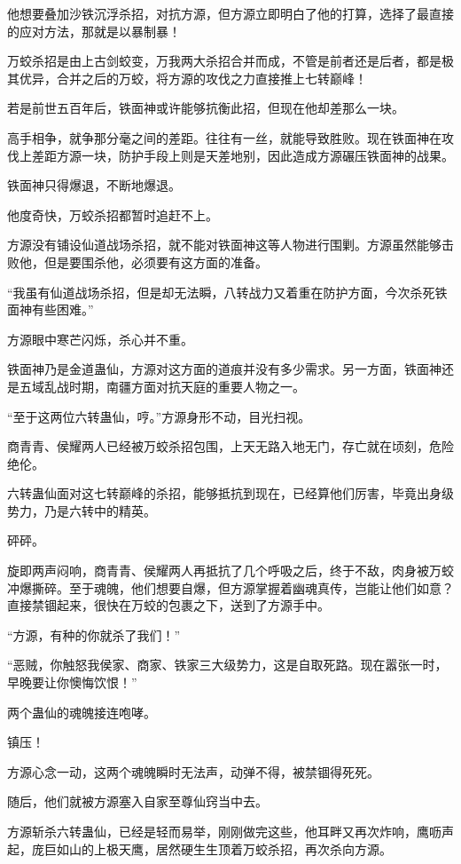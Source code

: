 \begin{this_body}
他想要叠加沙铁沉浮杀招，对抗方源，但方源立即明白了他的打算，选择了最直接的应对方法，那就是以暴制暴！

万蛟杀招是由上古剑蛟变，万我两大杀招合并而成，不管是前者还是后者，都是极其优异，合并之后的万蛟，将方源的攻伐之力直接推上七转巅峰！

若是前世五百年后，铁面神或许能够抗衡此招，但现在他却差那么一块。

高手相争，就争那分毫之间的差距。往往有一丝，就能导致胜败。现在铁面神在攻伐上差距方源一块，防护手段上则是天差地别，因此造成方源碾压铁面神的战果。

铁面神只得爆退，不断地爆退。

他度奇快，万蛟杀招都暂时追赶不上。

方源没有铺设仙道战场杀招，就不能对铁面神这等人物进行围剿。方源虽然能够击败他，但是要围杀他，必须要有这方面的准备。

“我虽有仙道战场杀招，但是却无法瞬，八转战力又着重在防护方面，今次杀死铁面神有些困难。”

方源眼中寒芒闪烁，杀心并不重。

铁面神乃是金道蛊仙，方源对这方面的道痕并没有多少需求。另一方面，铁面神还是五域乱战时期，南疆方面对抗天庭的重要人物之一。

“至于这两位六转蛊仙，哼。”方源身形不动，目光扫视。

商青青、侯耀两人已经被万蛟杀招包围，上天无路入地无门，存亡就在顷刻，危险绝伦。

六转蛊仙面对这七转巅峰的杀招，能够抵抗到现在，已经算他们厉害，毕竟出身级势力，乃是六转中的精英。

砰砰。

旋即两声闷响，商青青、侯耀两人再抵抗了几个呼吸之后，终于不敌，肉身被万蛟冲爆撕碎。至于魂魄，他们想要自爆，但方源掌握着幽魂真传，岂能让他们如意？直接禁锢起来，很快在万蛟的包裹之下，送到了方源手中。

“方源，有种的你就杀了我们！”

“恶贼，你触怒我侯家、商家、铁家三大级势力，这是自取死路。现在嚣张一时，早晚要让你懊悔饮恨！”

两个蛊仙的魂魄接连咆哮。

镇压！

方源心念一动，这两个魂魄瞬时无法声，动弹不得，被禁锢得死死。

随后，他们就被方源塞入自家至尊仙窍当中去。

方源斩杀六转蛊仙，已经是轻而易举，刚刚做完这些，他耳畔又再次炸响，鹰呖声起，庞巨如山的上极天鹰，居然硬生生顶着万蛟杀招，再次杀向方源。


\end{this_body}
